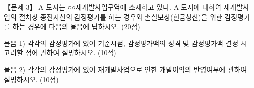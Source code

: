 \begin{longquestion}{【문제 3】}
A 토지는 ○○재개발사업구역에 소재하고 있다. A 토지에 대하여 재개발사업의 절차상 종전자산의 감정평가를 하는 경우와 손실보상(현금청산)을 위한 감정평가를 하는 경우에 다음의 물음에 답하시오. (20점) \par
\medskip\noindent 물음 1) 각각의 감정평가에 있어 기준시점, 감정평가액의 성격 및 감정평가액 결정 시 고려할 점에 관하여 설명하시오. (10점) \par
\medskip\noindent 물음 2) 각각의 감정평가에 있어 재개발사업으로 인한 개발이익의 반영여부에 관하여 설명하시오. (10점) \par
\end{longquestion}

